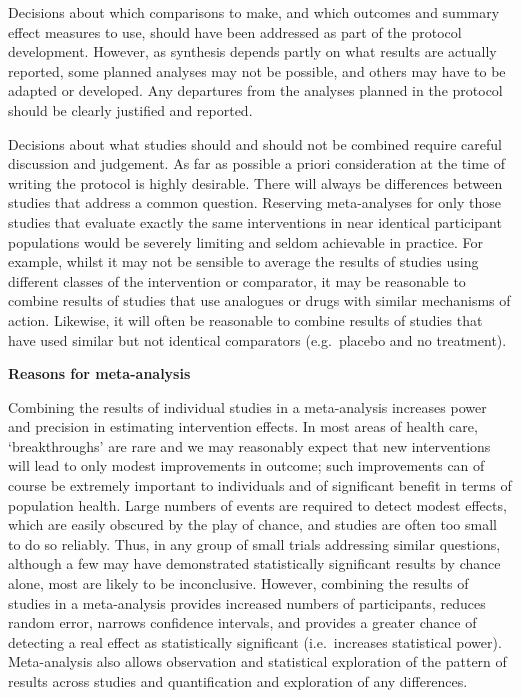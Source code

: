 \documentclass[
  11pt,
  a4paper,
  DIV=11,
  numbers=noendperiod]{scrreprt}
\begin{document}
Decisions about which comparisons to make, and which outcomes and
summary effect measures to use, should have been addressed as part of
the protocol development. However, as synthesis depends partly on what
results are actually reported, some planned analyses may not be
possible, and others may have to be adapted or developed. Any departures
from the analyses planned in the protocol should be clearly justified
and reported.

Decisions about what studies should and should not be combined require
careful discussion and judgement. As far as possible a priori
consideration at the time of writing the protocol is highly desirable.
There will always be differences between studies that address a common
question. Reserving meta-analyses for only those studies that evaluate
exactly the same interventions in near identical participant populations
would be severely limiting and seldom achievable in practice. For
example, whilst it may not be sensible to average the results of studies
using different classes of the intervention or comparator, it may be
reasonable to combine results of studies that use analogues or drugs
with similar mechanisms of action. Likewise, it will often be reasonable
to combine results of studies that have used similar but not identical
comparators (e.g.~placebo and no treatment).

\textbf{Reasons for meta-analysis}

Combining the results of individual studies in a meta-analysis increases
power and precision in estimating intervention effects. In most areas of
health care, `breakthroughs' are rare and we may reasonably expect that
new interventions will lead to only modest improvements in outcome; such
improvements can of course be extremely important to individuals and of
significant benefit in terms of population health. Large numbers of
events are required to detect modest effects, which are easily obscured
by the play of chance, and studies are often too small to do so
reliably. Thus, in any group of small trials addressing similar
questions, although a few may have demonstrated statistically
significant results by chance alone, most are likely to be inconclusive.
However, combining the results of studies in a meta-analysis provides
increased numbers of participants, reduces random error, narrows
confidence intervals, and provides a greater chance of detecting a real
effect as statistically significant (i.e.~increases statistical power).
Meta-analysis also allows observation and statistical exploration of the
pattern of results across studies and quantification and exploration of
any differences.
\end{document}
